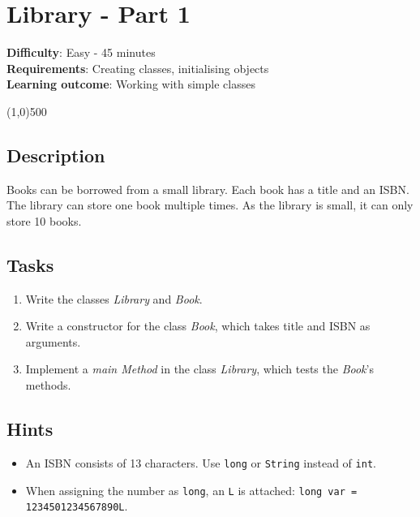 

\chapter*{Library - Part 1}

\headingfont
\parbox {\textwidth}{
    \textbf{Difficulty}: Easy - 45 minutes \\
    \textbf{Requirements}: Creating classes, initialising objects \\
    \textbf{Learning outcome}: Working with simple classes
}

\normalfont
\begin{center}
\line(1,0){500}
\end{center}
\vspace{1cm}

\section*{Description}
Books can be borrowed from a small library. Each book has a title and an ISBN. The library can store one book multiple times. 
As the library is small, it can only store 10 books.

\section*{Tasks}
\begin{enumerate}
     \item Write the classes \textit{Library} and \textit{Book}.
     \item Write a constructor for the class \textit{Book}, which takes title and ISBN as arguments.
     \item Implement a \textit{main Method} in the class \textit{Library}, which tests the \textit{Book}'s methods.
\end{enumerate}

\section*{Hints}
\begin{itemize}
    \item An ISBN consists of 13 characters. Use \texttt{long} or \texttt{String} instead of \texttt{int}.
    \item When assigning the number as \texttt{long}, an \texttt{L} is attached: \texttt{long var = 1234501234567890L}.
\end{itemize}

